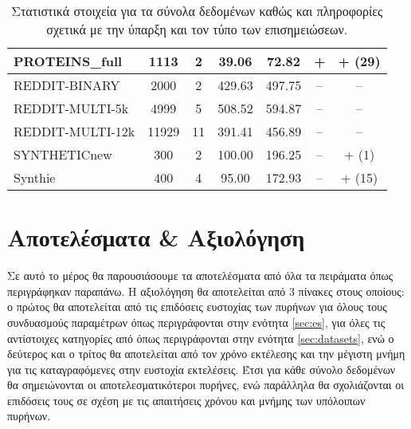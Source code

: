 \begin{table}[]
\begin{adjustbox}{angle=90}
{{\begin{tabularx}{0.853\textheight}{|l|c|c|c|c|c|c|}
PROTEINS\_full                & 1113           & 2               & 39.06                & 72.82                & +           & + (29)                            \\ \hline
REDDIT-BINARY                 & 2000           & 2               & 429.63               & 497.75               & –           & –                                 \\ \hline
REDDIT-MULTI-5k               & 4999           & 5               & 508.52               & 594.87               & –           & –                                 \\ \hline
REDDIT-MULTI-12k              & 11929          & 11              & 391.41               & 456.89               & –           & –                                 \\ \hline
SYNTHETICnew                  & 300            & 2               & 100.00               & 196.25               & –           & + (1)                             \\ \hline
Synthie                       & 400            & 4               & 95.00                & 172.93               & –           & + (15)                            \\ \hline
\end{tabularx}
}
}
\end{adjustbox}
\caption{Στατιστικά στοιχεία για τα σύνολα δεδομένων καθώς και πληροφορίες σχετικά με την ύπαρξη και τον τύπο των επισημειώσεων.}
\label{ref:dataset_statistics}
\end{table}
\section{Αποτελέσματα \& Αξιολόγηση}
Σε αυτό το μέρος θα παρουσιάσουμε τα αποτελέσματα από όλα τα πειράματα όπως περιγράφηκαν παραπάνω.
Η αξιολόγηση θα αποτελείται από 3 πίνακες στους οποίους: ο πρώτος θα αποτελείται από τις επιδόσεις ευστοχίας των πυρήνων για όλους τους συνδυασμούς παραμέτρων όπως περιγράφονται στην ενότητα \ref{sec:es}, για όλες τις αντίστοιχες κατηγορίες από  όπως περιγράφονται στην ενότητα \ref{sec:datasets}, ενώ ο δεύτερος και ο τρίτος θα αποτελείται από τον χρόνο εκτέλεσης και την μέγιστη μνήμη για τις καταγραφόμενες στην ευστοχία εκτελέσεις.
Έτσι για κάθε σύνολο δεδομένων θα σημειώνονται οι αποτελεσματικότεροι πυρήνες, ενώ παράλληλα θα σχολιάζονται οι επιδόσεις τους σε σχέση με τις απαιτήσεις χρόνου και μνήμης των υπόλοιπων πυρήνων.

